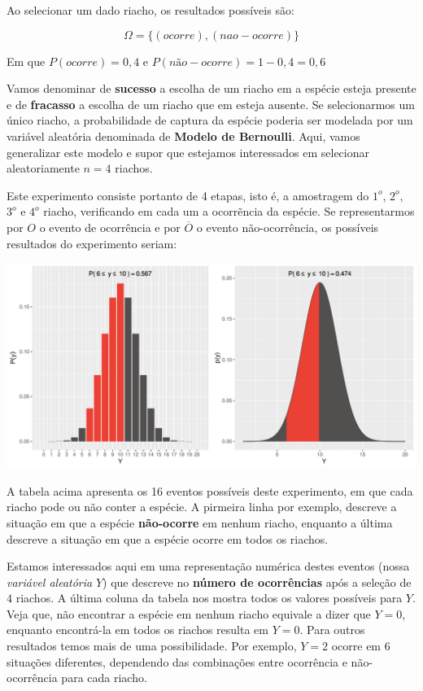 \documentclass[
]{book}
\begin{document}
Ao selecionar um dado riacho, os resultados possíveis são:

\[\Omega = \{(ocorre), (nao-ocorre)\}\]

Em que \(P(ocorre) = 0,4\) e \(P(não-ocorre) = 1-0,4 = 0,6\)

Vamos denominar de \textbf{sucesso} a escolha de um riacho em a espécie esteja presente e de \textbf{fracasso} a escolha de um riacho que em esteja ausente. Se selecionarmos um único riacho, a probabilidade de captura da espécie poderia ser modelada por um variável aleatória denominada de \textbf{Modelo de Bernoulli}. Aqui, vamos generalizar este modelo e supor que estejamos interessados em selecionar aleatoriamente \(n = 4\) riachos.

Este experimento consiste portanto de 4 etapas, isto é, a amostragem do \(1^o\), \(2^o\), \(3^o\) e \(4^o\) riacho, verificando em cada um a ocorrẽncia da espécie. Se representarmos por \(O\) o evento de ocorrência e por \(\overline{O}\) o evento não-ocorrência, os possíveis resultados do experimento seriam:

\includegraphics{probest-cambientais_files/figure-latex/unnamed-chunk-203-1.pdf}

A tabela acima apresenta os 16 eventos possíveis deste experimento, em que cada riacho pode ou não conter a espécie. A pirmeira linha por exemplo, descreve a situação em que a espécie \textbf{não-ocorre} em nenhum riacho, enquanto a última descreve a situação em que a espécie ocorre em todos os riachos.

Estamos interessados aqui em uma representação numérica destes eventos (nossa \emph{variável aleatória} \(Y\)) que descreve no \textbf{número de ocorrências} após a seleção de \(4\) riachos. A última coluna da tabela nos mostra todos os valores possíveis para \(Y\). Veja que, não encontrar a espécie em nenhum riacho equivale a dizer que \(Y = 0\), enquanto encontrá-la em todos os riachos resulta em \(Y = 0\). Para outros resultados temos mais de uma possibilidade. Por exemplo, \(Y = 2\) ocorre em 6 situações diferentes, dependendo das combinações entre ocorrência e não-ocorrência para cada riacho.
\end{document}
